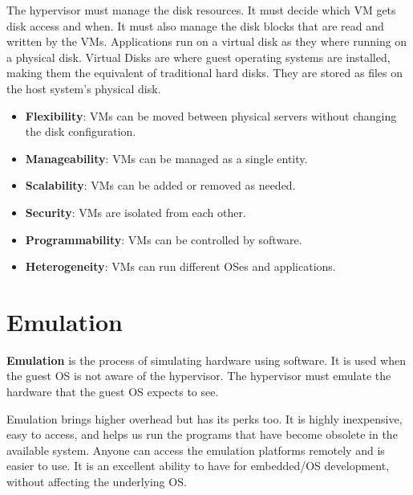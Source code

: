 The hypervisor must manage the disk resources. It must decide which VM gets disk access and when. It must also manage the disk blocks that are read and written by the VMs. Applications run on a virtual disk as they where running on a physical disk.
Virtual Disks are where guest operating systems are installed, making them the
equivalent of traditional hard disks. They are stored as files on the host system’s
physical disk.

\begin{itemize}
    \item \textbf{Flexibility}: VMs can be moved between physical servers without changing the disk configuration.
    \item \textbf{Manageability}: VMs can be managed as a single entity.
    \item \textbf{Scalability}: VMs can be added or removed as needed.
    \item \textbf{Security}: VMs are isolated from each other.
    \item \textbf{Programmability}: VMs can be controlled by software.
    \item \textbf{Heterogeneity}: VMs can run different OSes and applications.
\end{itemize}

\section{Emulation}

\textbf{Emulation} is the process of simulating hardware using software. It is used when the guest OS is not aware of the hypervisor. The hypervisor must emulate the hardware that the guest OS expects to see.

Emulation brings higher overhead but has its perks too. It is highly inexpensive, easy to access,
and helps us run the programs that have become obsolete in the available system. Anyone can access the emulation platforms remotely and is easier to use. It is an excellent
ability to have for embedded/OS development, without affecting the underlying OS.

